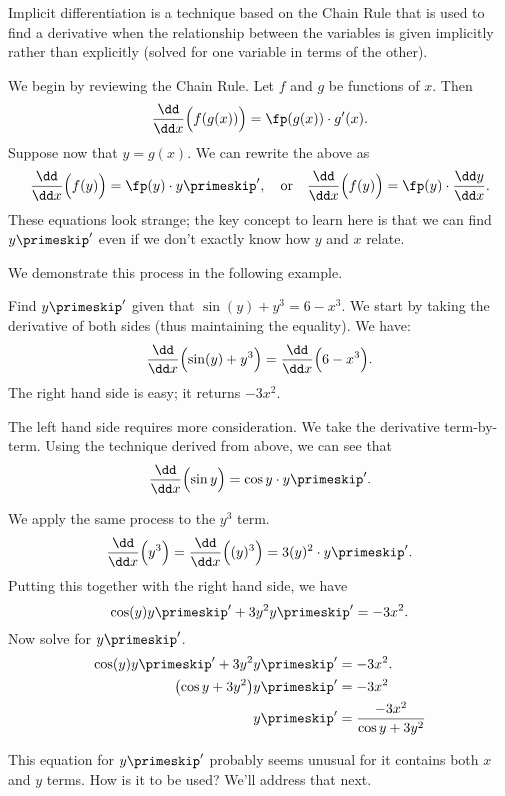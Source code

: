 Implicit differentiation is a technique based on the Chain Rule that is used to find a derivative when the relationship between the variables is given implicitly rather than explicitly (solved for one variable in terms of the other).\bigskip

We begin by reviewing the Chain Rule. Let $f$ and $g$ be functions of $x$. Then
\[\frac{\dd}{\dd x}\Bigl(f(g(x))\Bigr) = \fp(g(x))\cdot g'(x).\]
Suppose now that $y=g(x)$. We can rewrite the above as
\begin{equation}
\frac{\dd}{\dd x}\Bigl(f(y)\Bigr) = \fp(y)\cdot y\primeskip', \quad \text{or}\quad
\frac{\dd}{\dd x}\Bigl(f(y)\Bigr) = \fp(y)\cdot \frac{\dd y}{\dd x} .\label{eq:implicit1}
\end{equation}
These equations look strange; the key concept to learn here is that we can find $y\primeskip'$ even if we don't exactly know how $y$ and $x$ relate.


We demonstrate this process in the following example.

\begin{example}\label{ex_implicit1}%
Find $y\primeskip'$ given that $\sin(y) + y^3=6-x^3$.
\solution
We start by taking the derivative of both sides (thus maintaining the equality). We have:
\[\frac{\dd}{\dd x}\Bigl(\sin(y) + y^3\Bigr)=\frac{\dd}{\dd x}\Bigl(6-x^3\Bigr).\]
The right hand side is easy; it returns $-3x^2$. 

The left hand side requires more consideration. We take the derivative term-by-term.  Using the technique derived from  above, we can see that
\vspace{-.3\baselineskip}
\[\frac{\dd}{\dd x}\Bigl(\sin y\Bigr) = \cos y \cdot y\primeskip'.\] %

We apply the same process to the $y^3$ term. 
\[
\frac{\dd}{\dd x}\Bigl(y^3\Bigr) = \frac{\dd}{\dd x}\Bigl((y)^3\Bigr) = 3(y)^2\cdot y\primeskip'.
\]
Putting this together with the right hand side, we have
\[\cos(y)y\primeskip'+3y^2y\primeskip' = -3x^2.\]
Now solve for $y\primeskip'$.\vspace{-.5\baselineskip}
\begin{align*}
	\cos(y)y\primeskip'+3y^2y\primeskip' 	&= -3x^2.\\
	\bigl(\cos y+3y^2\bigr)y\primeskip' &=	-3x^2\\
	y\primeskip'&=	\frac{-3x^2}{\cos y+3y^2}
\end{align*}

This equation for $y\primeskip'$ probably seems unusual for it contains both $x$ and $y$ terms. How is it to be used? We'll address that next.
\end{example}

